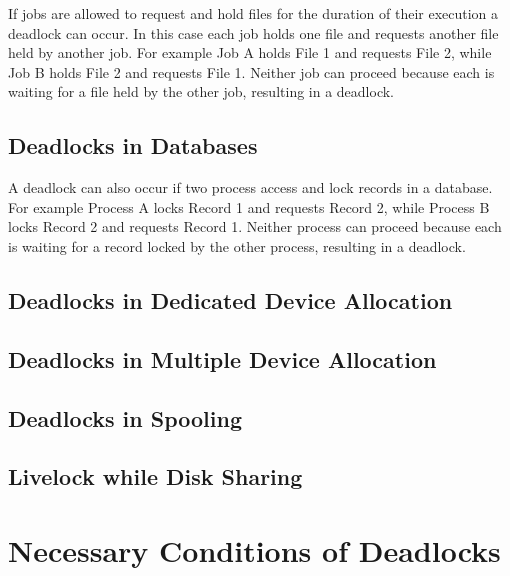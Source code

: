 \documentclass[12pt letter]{report}
\begin{document}
If jobs are allowed to request and hold files for the duration of
their execution a deadlock can occur. In this case each job holds one
file and requests another file held by another job. For example Job A
holds File 1 and requests File 2, while Job B holds File 2 and
requests File 1. Neither job can proceed because each is waiting for a
file held by the other job, resulting in a deadlock.

\subsection{Deadlocks in Databases}

A deadlock can also occur if two process access and lock records in a
database. For example Process A locks Record 1 and requests
Record 2, while Process B locks Record 2 and requests Record 1. Neither
process can proceed because each is waiting for a record locked by the
other process, resulting in a deadlock.

\subsection{Deadlocks in Dedicated Device Allocation}

\subsection{Deadlocks in Multiple Device Allocation}

\subsection{Deadlocks in Spooling}

\subsection{Livelock while Disk Sharing}


\section{Necessary Conditions of Deadlocks}
\end{document}
